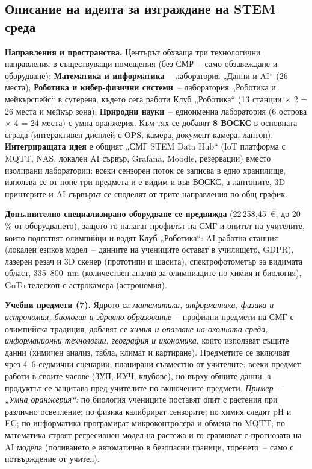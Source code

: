 \documentclass[11pt,a4paper]{article}
\newcommand{\NumSpec}{22\,258,45~€}
\begin{document}
\subsection{Описание на идеята за изграждане на STEM среда}

\textbf{Направления и пространства.} Центърът обхваща три технологични направления в съществуващи помещения (без СМР~– само обзавеждане и оборудване): \textbf{Математика и информатика}~– лаборатория „Данни и AI“ (26 места); \textbf{Роботика и кибер-физични системи}~– лаборатория „Роботика и мейкърспейс“ в сутерена, където сега работи Клуб „Роботика“ (13 станции $\times$ 2 = 26 места и мейкър зона); \textbf{Природни науки}~– едноименна лаборатория (6 острова $\times$ 4 = 24 места) с умна оранжерия. Към тях се добавят \textbf{8 ВОСКС} в основната сграда (интерактивен дисплей с OPS, камера, документ-камера, лаптоп). \textbf{Интегриращата идея} е общият „СМГ STEM Data Hub“ (IoT платформа с MQTT, NAS, локален AI сървър, Grafana, Moodle, резервации) вместо изолирани лаборатории: всеки сензорен поток се записва в едно хранилище, използва се от поне три предмета и е видим и във ВОСКС, а лаптопите, 3D принтерите и AI сървърът се споделят от трите направления по общ график.

\textbf{Допълнително специализирано оборудване се предвижда} (\NumSpec, до 20\,\% от оборудването), защото го налагат профилът на СМГ и опитът на учителите, които подготвят олимпийци и водят Клуб „Роботика“: AI работна станция (локален езиков модел~– данните на учениците остават в училището, GDPR), лазерен резач и 3D скенер (прототипи и шасита), спектрофотометър за видимата област, 335–800~nm (количествен анализ за олимпиадите по химия и биология), GoTo телескоп с астрокамера (астрономия).

\textbf{Учебни предмети (7).} Ядрото са \emph{математика, информатика, физика и астрономия, биология и здравно образование}~– профилни предмети на СМГ с олимпийска традиция; добавят се \emph{химия и опазване на околната среда, информационни технологии, география и икономика}, които използват същите данни (химичен анализ, табла, климат и картиране). Предметите се включват чрез 4–6-седмични сценарии, планирани съвместно от учителите: всеки предмет работи в своите часове (ЗУП, ИУЧ, клубове), но върху общите данни, а продуктът се защитава пред учителите по включените предмети. \emph{Пример~– „Умна оранжерия“:} по биология учениците поставят опит с растения при различно осветление; по физика калибрират сензорите; по химия следят pH и EC; по информатика програмират микроконтролера и обмена по MQTT; по математика строят регресионен модел на растежа и го сравняват с прогнозата на AI модела (поливането е автоматично в безопасни граници, торенето~– само с потвърждение от учител).
\end{document}
